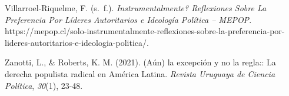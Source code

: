 \documentclass[
  spanish,
  a4paper,
  oneside]{scrbook}
\newlength{\cslhangindent}
\newenvironment{CSLReferences}[2] %
 {\begin{list}{}{%
  \setlength{\itemindent}{0pt}
  \setlength{\leftmargin}{0pt}
  \setlength{\parsep}{0pt}
  \ifodd #1
   \setlength{\leftmargin}{\cslhangindent}
   \setlength{\itemindent}{-1\cslhangindent}
  \fi
  \setlength{\itemsep}{#2\baselineskip}}}
 {\end{list}}
\begin{document}
\begin{CSLReferences}{1}{0}
Villarroel-Riquelme, F. (s.~f.).\emph{
Instrumentalmente? {Reflexiones} Sobre La Preferencia Por Líderes
Autoritarios e Ideología Política -- {MEPOP}}.
https://mepop.cl/solo-instrumentalmente-reflexiones-sobre-la-preferencia-por-lideres-autoritarios-e-ideologia-politica/.

Zanotti, L., \& Roberts, K. M. (2021). {(Aún) la excepción y no la
regla:: La derecha populista radical en América Latina}. \emph{Revista
Uruguaya de Ciencia Política}, \emph{30}(1), 23-48.

\end{CSLReferences}


\backmatter

\mainmatter
\pagestyle{scrheadings}

\end{document}
